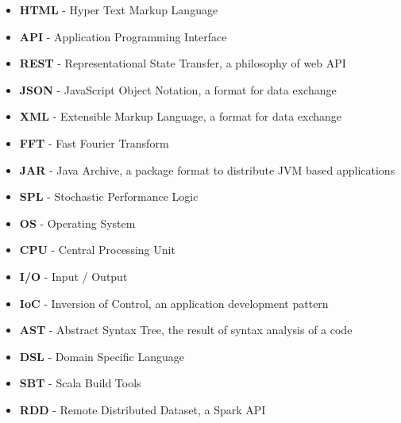 \documentclass[12pt,a4paper]{report}
\begin{document}



\tableofcontents














\listoffigures

\listoftables


\begin{itemize}
	\item \textbf{HTML} - Hyper Text Markup Language
	\item \textbf{API} - Application Programming Interface
	\item \textbf{REST} - Representational State Transfer, a philosophy of web API
	\item \textbf{JSON} - JavaScript Object Notation, a format for data exchange
	\item \textbf{XML} - Extensible Markup Language, a format for data exchange
	\item \textbf{FFT} - Fast Fourier Transform
	\item \textbf{JAR} - Java Archive, a package format to distribute JVM based applications
	\item \textbf{SPL} - Stochastic Performance Logic
	\item \textbf{OS} - Operating System
	\item \textbf{CPU} - Central Processing Unit
	\item \textbf{I/O} - Input / Output
	\item \textbf{IoC} - Inversion of Control, an application development pattern
	\item \textbf{AST} - Abstract Syntax Tree, the result of syntax analysis of a code
	\item \textbf{DSL} - Domain Specific Language
	\item \textbf{SBT} - Scala Build Tools
	\item \textbf{RDD} - Remote Distributed Dataset, a Spark API
\end{itemize}
\end{document}
